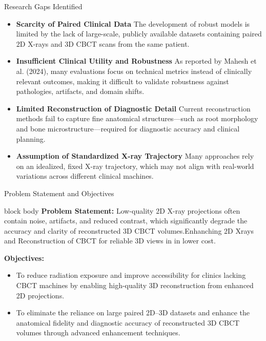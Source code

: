 \documentclass[aspectratio=169]{beamer}
\begin{document}
\begin{frame}{Research Gaps Identified}
\begin{itemize}
    \item \textbf{Scarcity of Paired Clinical Data}  
    The development of robust models is limited by the lack of large-scale, publicly available datasets containing paired 2D X-rays and 3D CBCT scans from the same patient.
    \item \textbf{Insufficient Clinical Utility and Robustness}  
    As reported by Mahesh et al. (2024), many evaluations focus on technical metrics instead of clinically relevant outcomes, making it difficult to validate robustness against pathologies, artifacts, and domain shifts.\cite{shin2025sparse}
    \item \textbf{Limited Reconstruction of Diagnostic Detail}  
    Current reconstruction methods fail to capture fine anatomical structures—such as root morphology and bone microstructure—required for diagnostic accuracy and clinical planning.\cite{ma2024px2tooth}
    \item \textbf{Assumption of Standardized X-ray Trajectory}  
    Many approaches rely on an idealized, fixed X-ray trajectory, which may not align with real-world variations across different clinical machines.\cite{song2021oral}
\end{itemize}
\end{frame}

\begin{frame}{Problem Statement and Objectives}

\begin{beamercolorbox}[rounded=true, shadow=true, sep=1em, wd=\textwidth]{block body}
\textbf{Problem Statement:}  
Low-quality 2D X-ray projections often contain noise, artifacts, and reduced contrast, which significantly degrade the accuracy and clarity of reconstructed 3D CBCT volumes.Enhanching 2D Xrays and Reconstruction of CBCT for reliable 3D views in in lower cost.
\end{beamercolorbox}

\vspace{0.4cm}

\textbf{Objectives:}
\begin{itemize}
    \item To reduce radiation exposure and improve accessibility for clinics lacking CBCT machines by enabling high-quality 3D reconstruction from enhanced 2D projections.
    
    \item To eliminate the reliance on large paired 2D--3D datasets and enhance the anatomical fidelity and diagnostic accuracy of reconstructed 3D CBCT volumes through advanced enhancement techniques.
\end{itemize}

\end{frame}
\end{document}
